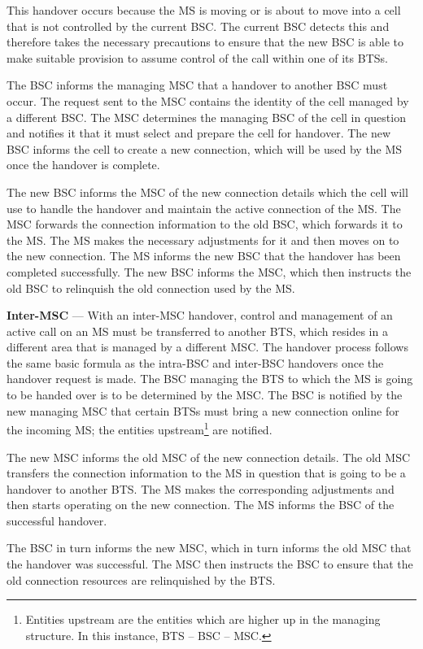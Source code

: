 \begin{description}
This handover occurs because the MS is moving or is about to move into a cell that is not controlled by the current BSC. The current BSC detects this and therefore takes the necessary precautions to ensure that the new BSC is able to make suitable provision to assume control of the call within one of its BTSs\cite{wirelesstelcoMullet,GSMArchitectureProtocolsServices}.

The BSC informs the managing MSC that a handover to another BSC must occur. The request sent to the MSC contains the identity of the cell managed by a different BSC. The MSC determines the managing BSC of the cell in question and notifies it that it must select and prepare the cell for handover. The new BSC informs the cell to create a new connection, which will be used by the MS once the handover is complete\cite{wirelesstelcoMullet,GSMArchitectureProtocolsServices}.

The new BSC informs the MSC of the new connection details which the cell will use to handle the handover and maintain the active connection of the MS. The MSC forwards the connection information to the old BSC, which forwards it to the MS. The MS makes the necessary adjustments for it and then moves on to the new connection. The MS informs the new BSC that the handover has been completed successfully. The new BSC informs the MSC, which then instructs the old BSC to relinquish the old connection used by the MS\cite{wirelesstelcoMullet,GSMArchitectureProtocolsServices}.
\item{\textbf{Inter-MSC}} --- With an inter-MSC handover, control and management of an active call on an MS must be transferred to another BTS, which resides in a different area that is managed by a different MSC. The handover process follows the same basic formula as the intra-BSC and inter-BSC handovers once the handover request is made\cite{wirelesstelcoMullet,GSMArchitectureProtocolsServices}.
The BSC managing the BTS to which the MS is going to be handed over is to be determined by the MSC. The BSC is notified by the new managing MSC that certain BTSs must bring a new connection online for the incoming MS; the entities upstream\footnote{Entities upstream are the entities which are higher up in the managing structure. In this instance, BTS -- BSC -- MSC.} are notified\cite{wirelesstelcoMullet,GSMArchitectureProtocolsServices}.

The new MSC informs the old MSC of the new connection details. The old MSC transfers the connection information to the MS in question that is going to be a handover to another BTS. The MS makes the corresponding adjustments and then starts operating on the new connection. The MS informs the BSC of the successful handover\cite{wirelesstelcoMullet,GSMArchitectureProtocolsServices}. 

The BSC in turn informs the new MSC, which in turn informs the old MSC that the handover was successful. The MSC then instructs the BSC to ensure that the old connection resources are relinquished by the BTS.
\end{description}

